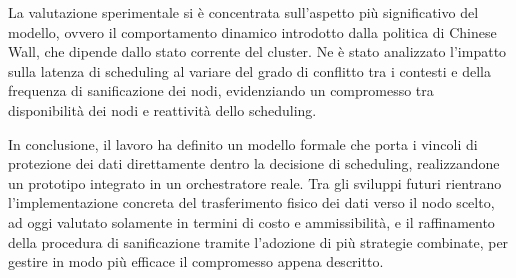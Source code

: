 La valutazione sperimentale si è concentrata sull'aspetto più significativo del modello, ovvero il comportamento dinamico introdotto dalla politica di Chinese Wall, che dipende dallo stato corrente del cluster. Ne è stato analizzato l'impatto sulla latenza di scheduling al variare del grado di conflitto tra i contesti e della frequenza di sanificazione dei nodi, evidenziando un compromesso tra disponibilità dei nodi e reattività dello scheduling.

In conclusione, il lavoro ha definito un modello formale che porta i vincoli di protezione dei dati direttamente dentro la decisione di scheduling, realizzandone un prototipo integrato in un orchestratore reale. Tra gli sviluppi futuri rientrano l'implementazione concreta del trasferimento fisico dei dati verso il nodo scelto, ad oggi valutato solamente in termini di costo e ammissibilità, e il raffinamento della procedura di sanificazione tramite l'adozione di più strategie combinate, per gestire in modo più efficace il compromesso appena descritto.